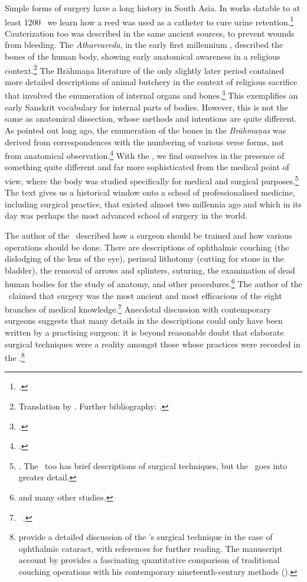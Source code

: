 Simple forms of surgery have a long history in South Asia. In works datable to at
least 1200 \BC\ we learn how a reed was used as a catheter to cure urine
retention.\footcite[70--71]{zysk-1985} Cauterization too was described in the same
ancient sources, to prevent wounds from bleeding. The \emph{Atharvaveda}, in the
early first millennium \BC, described the bones of the human body, showing early
anatomical awareness in a religious context.\footnote{Translation by \citet[\S43,
    \S100]{hoer-1907}. Further bibliography: \cite[IIB, 819]{meul-hist}.} The Brāhmaṇa
    literature of the only slightly later period contained more detailed descriptions
    of animal butchery in the context of religious sacrifice that involved the
    enumeration of internal organs and bones.\footcite{mala-1996,saha-2015}   This
    exemplifies an early Sanskrit vocabulary for internal parts of bodies.  However,
    this is not the same as anatomical dissection, whose methods and intentions are
    quite different. As \citeauthor{keit-1908} pointed out long ago, the enumeration
    of the bones in the \emph{Brāhmaṇas} was derived from correspondences with the
    numbering of various verse forms, not from anatomical
    observation.\footcite{keit-1908}  With the \SS, we find ourselves in the presence
    of something quite different and far more sophisticated from the medical point of
    view, where the body was studied specifically for medical and surgical
    purposes.\footnote{\cite{zysk-1986}. The \CS\ too has brief descriptions of
        surgical techniques, but the \SS\ goes into greater detail.} The text gives us a
        historical window onto a school of professionalised medicine, including surgical
        practice, that existed almost two millennia ago and which in its day was perhaps
        the most advanced school of surgery in the world.

The author of the \SS\ described how a surgeon should be trained and how various
operations should be done.  There are descriptions of ophthalmic couching (the
dislodging of the lens of the eye), perineal lithotomy (cutting for stone in the
bladder), the removal of arrows and splinters, suturing, the examination of dead
human bodies for the study of anatomy, and other
procedures.\footnote{\cites{mukh-1913,
    desh-2000,nara-2011,wuja-2003,wils-1823,vali-2007} and many other
    studies.} The author of the \SS\ claimed that
    surgery was the most ancient and most efficacious of the eight branches of medical
    knowledge.\footnote{\SS\ .} Anecdotal discussion with
        contemporary surgeons suggests that many details in the descriptions could only
        have been written by a practising surgeon: it is beyond reasonable doubt that
        elaborate surgical techniques were a reality amongst those whose practices were
        recorded in the \SS.\footnote{\citet{leff-2020} provide a detailed discussion of
            the \SS's surgical technique in the case of ophthalmic cataract, with references
            for further reading. The manuscript account by \citet{jack-1884} provides a
            fascinating quantitative comparison of traditional couching operations with his
            contemporary nineteenth-century 
            methods ().}

